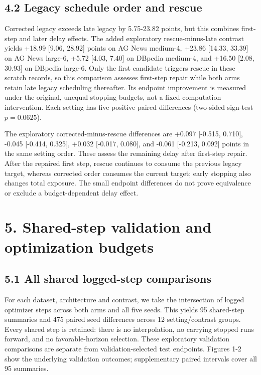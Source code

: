 \documentclass[smallextended]{svjour3}
\begin{document}
\subsection{4.2 Legacy schedule order and rescue}\label{legacy-schedule-order-and-rescue}

Corrected legacy exceeds late legacy by 5.75-23.82 points, but this combines first-step and later delay effects. The added exploratory rescue-minus-late contrast yields +18.99 {[}9.06, 28.92{]} points on AG News medium-4, +23.86 {[}14.33, 33.39{]} on AG News large-6, +5.72 {[}4.03, 7.40{]} on DBpedia medium-4, and +16.50 {[}2.08, 30.93{]} on DBpedia large-6. Only the first candidate triggers rescue in these scratch records, so this comparison assesses first-step repair while both arms retain late legacy scheduling thereafter. Its endpoint improvement is measured under the original, unequal stopping budgets, not a fixed-computation intervention. Each setting has five positive paired differences (two-sided sign-test \(p=0.0625\)).

The exploratory corrected-minus-rescue differences are +0.097 {[}-0.515, 0.710{]}, -0.045 {[}-0.414, 0.325{]}, +0.032 {[}-0.017, 0.080{]}, and -0.061 {[}-0.213, 0.092{]} points in the same setting order. These assess the remaining delay after first-step repair. After the repaired first step, rescue continues to consume the previous legacy target, whereas corrected order consumes the current target; early stopping also changes total exposure. The small endpoint differences do not prove equivalence or exclude a budget-dependent delay effect.

\section{5. Shared-step validation and optimization budgets}\label{shared-step-validation-and-optimization-budgets}

\subsection{5.1 All shared logged-step comparisons}\label{all-shared-logged-step-comparisons}

For each dataset, architecture and contrast, we take the intersection of logged optimizer steps across both arms and all five seeds. This yields 95 shared-step summaries and 475 paired seed differences across 12 setting/contrast groups. Every shared step is retained: there is no interpolation, no carrying stopped runs forward, and no favorable-horizon selection. These exploratory validation comparisons are separate from validation-selected test endpoints. Figures 1-2 show the underlying validation outcomes; supplementary paired intervals cover all 95 summaries.
\end{document}
